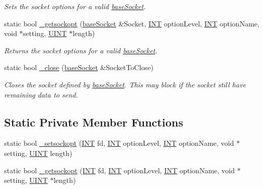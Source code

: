\begin{DoxyCompactItemize}
\begin{DoxyCompactList}\small\item\em Sets the socket options for a valid \hyperlink{class_communication_1_1base_socket}{base\+Socket}. \end{DoxyCompactList}\item 
static bool \hyperlink{class_communication_1_1_o_s_a7cc538effe2bc9098f69ab8ba994bd3b}{\+\_\+getsockopt} (\hyperlink{class_communication_1_1base_socket}{base\+Socket} \&Socket, \hyperlink{typedefs_8h_a0240b856f74f8905ed334a5a0ca624e5}{I\+N\+T} option\+Level, \hyperlink{typedefs_8h_a0240b856f74f8905ed334a5a0ca624e5}{I\+N\+T} option\+Name, void $\ast$setting, \hyperlink{typedefs_8h_a2e2c38961834f28c06e17e074eb00bc7}{U\+I\+N\+T} $\ast$length)
\begin{DoxyCompactList}\small\item\em Returns the socket options for a valid \hyperlink{class_communication_1_1base_socket}{base\+Socket}. \end{DoxyCompactList}\item 
static bool \hyperlink{class_communication_1_1_o_s_a61e6b800ca7347f20a8326e7d7666b46}{\+\_\+close} (\hyperlink{class_communication_1_1base_socket}{base\+Socket} \&Socket\+To\+Close)
\begin{DoxyCompactList}\small\item\em Closes the socket defined by \hyperlink{class_communication_1_1base_socket}{base\+Socket}. This may block if the socket still have remaining data to send. \end{DoxyCompactList}\end{DoxyCompactItemize}
\subsection*{Static Private Member Functions}
\begin{DoxyCompactItemize}
\item 
static bool \hyperlink{class_communication_1_1_o_s_a2d41fbe0a2a5fb63ba2ab1e92ab8b5cc}{\+\_\+setsockopt} (\hyperlink{typedefs_8h_a0240b856f74f8905ed334a5a0ca624e5}{I\+N\+T} fd, \hyperlink{typedefs_8h_a0240b856f74f8905ed334a5a0ca624e5}{I\+N\+T} option\+Level, \hyperlink{typedefs_8h_a0240b856f74f8905ed334a5a0ca624e5}{I\+N\+T} option\+Name, void $\ast$setting, \hyperlink{typedefs_8h_a2e2c38961834f28c06e17e074eb00bc7}{U\+I\+N\+T} length)
\item 
static bool \hyperlink{class_communication_1_1_o_s_af6efca24886339b80a5db677bc30ef59}{\+\_\+getsockopt} (\hyperlink{typedefs_8h_a0240b856f74f8905ed334a5a0ca624e5}{I\+N\+T} fd, \hyperlink{typedefs_8h_a0240b856f74f8905ed334a5a0ca624e5}{I\+N\+T} option\+Level, \hyperlink{typedefs_8h_a0240b856f74f8905ed334a5a0ca624e5}{I\+N\+T} option\+Name, void $\ast$setting, \hyperlink{typedefs_8h_a2e2c38961834f28c06e17e074eb00bc7}{U\+I\+N\+T} $\ast$length)
\end{DoxyCompactItemize}


